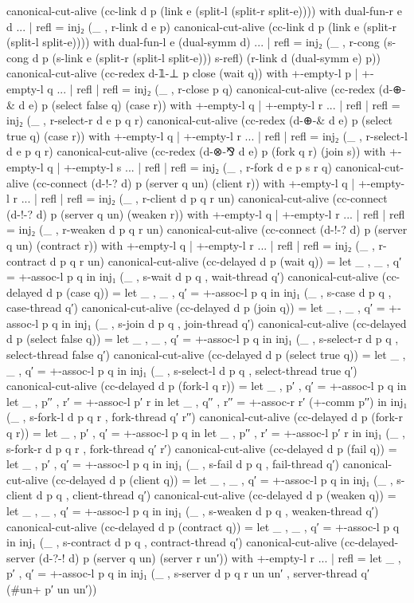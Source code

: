 \begin{code}[hide]
canonical-cut-alive (cc-link d p (link e (split-l (split-r split-e)))) with dual-fun-r e d
... | refl = inj₂ (_ , r-link d e p)
canonical-cut-alive (cc-link d p (link e (split-r (split-l split-e)))) with dual-fun-l e (dual-symm d)
... | refl = inj₂ (_ , r-cong (s-cong d p (s-link e (split-r (split-l split-e))) s-refl) (r-link d (dual-symm e) p))
canonical-cut-alive (cc-redex d-𝟙-⊥ p close (wait q)) with +-empty-l p | +-empty-l q
... | refl | refl = inj₂ (_ , r-close p q)
canonical-cut-alive (cc-redex (d-⊕-& d e) p (select false q) (case r)) with +-empty-l q | +-empty-l r
... | refl | refl = inj₂ (_ , r-select-r d e p q r)
canonical-cut-alive (cc-redex (d-⊕-& d e) p (select true q) (case r)) with +-empty-l q | +-empty-l r
... | refl | refl = inj₂ (_ , r-select-l d e p q r)
canonical-cut-alive (cc-redex (d-⊗-⅋ d e) p (fork q r) (join s)) with +-empty-l q | +-empty-l s
... | refl | refl = inj₂ (_ , r-fork d e p s r q)
canonical-cut-alive (cc-connect (d-!-? d) p (server q un) (client r)) with +-empty-l q | +-empty-l r
... | refl | refl = inj₂ (_ , r-client d p q r un)
canonical-cut-alive (cc-connect (d-!-? d) p (server q un) (weaken r)) with +-empty-l q | +-empty-l r
... | refl | refl = inj₂ (_ , r-weaken d p q r un)
canonical-cut-alive (cc-connect (d-!-? d) p (server q un) (contract r)) with +-empty-l q | +-empty-l r
... | refl | refl = inj₂ (_ , r-contract d p q r un)
canonical-cut-alive (cc-delayed d p (wait q)) =
  let _ , _ , q′ = +-assoc-l p q in
  inj₁ (_ , s-wait d p q , wait-thread q′)
canonical-cut-alive (cc-delayed d p (case q)) =
  let _ , _ , q′ = +-assoc-l p q in
  inj₁ (_ , s-case d p q , case-thread q′)
canonical-cut-alive (cc-delayed d p (join q)) =
  let _ , _ , q′ = +-assoc-l p q in
  inj₁ (_ , s-join d p q , join-thread q′)
canonical-cut-alive (cc-delayed d p (select false q)) =
  let _ , _ , q′ = +-assoc-l p q in
  inj₁ (_ , s-select-r d p q , select-thread false q′)
canonical-cut-alive (cc-delayed d p (select true q)) =
  let _ , _ , q′ = +-assoc-l p q in
  inj₁ (_ , s-select-l d p q , select-thread true q′)
canonical-cut-alive (cc-delayed d p (fork-l q r)) =
  let _ , p′ , q′ = +-assoc-l p q in
  let _ , p′′ , r′ = +-assoc-l p′ r in
  let _ , q′′ , r′′ = +-assoc-r r′ (+-comm p′′) in
  inj₁ (_ , s-fork-l d p q r , fork-thread q′ r′′)
canonical-cut-alive (cc-delayed d p (fork-r q r)) =
  let _ , p′ , q′ = +-assoc-l p q in
  let _ , p′′ , r′ = +-assoc-l p′ r in
  inj₁ (_ , s-fork-r d p q r , fork-thread q′ r′)
canonical-cut-alive (cc-delayed d p (fail q)) =
  let _ , p′ , q′ = +-assoc-l p q in
  inj₁ (_ , s-fail d p q , fail-thread q′)
canonical-cut-alive (cc-delayed d p (client q)) =
  let _ , _ , q′ = +-assoc-l p q in
  inj₁ (_ , s-client d p q , client-thread q′)
canonical-cut-alive (cc-delayed d p (weaken q)) =
  let _ , _ , q′ = +-assoc-l p q in
  inj₁ (_ , s-weaken d p q , weaken-thread q′)
canonical-cut-alive (cc-delayed d p (contract q)) =
  let _ , _ , q′ = +-assoc-l p q in
  inj₁ (_ , s-contract d p q , contract-thread q′)
canonical-cut-alive (cc-delayed-server (d-?-! d) p (server q un) (server r un′)) with +-empty-l r
... | refl =
  let _ , p′ , q′ = +-assoc-l p q in
  inj₁ (_ , s-server d p q r un un′ , server-thread q′ (#un+ p′ un un′))
\end{code}

